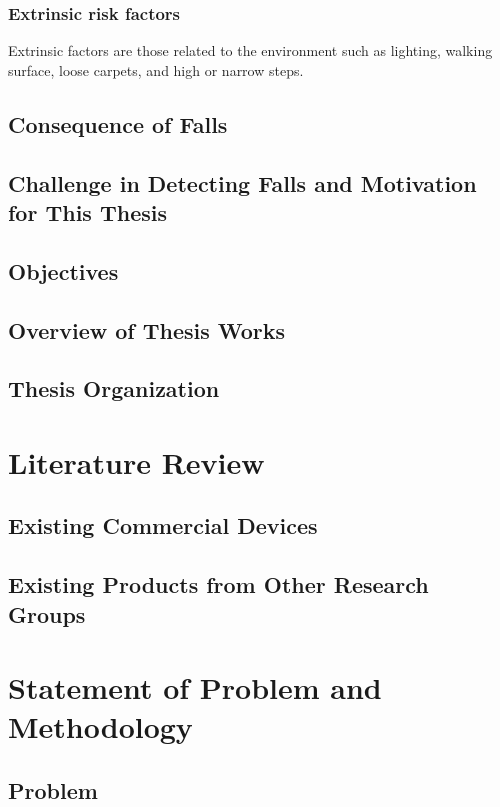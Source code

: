\documentclass[letterpaper,12pt,titlepage,oneside,final]{book}
\begin{document}
\subsection{Extrinsic risk factors}
Extrinsic factors are those related to the environment such as lighting, walking surface, loose carpets, and high or narrow steps. 
\section{Consequence of Falls}

\section{Challenge in Detecting Falls and Motivation for This Thesis}

\section{Objectives}

\section{Overview of Thesis Works}

\section{Thesis Organization}

\chapter{Literature Review}

\section{Existing Commercial Devices}

\section{Existing Products from Other Research Groups}


\chapter{Statement of Problem and Methodology}

\section{Problem}
\end{document}
